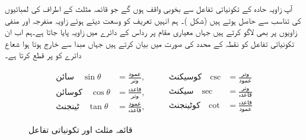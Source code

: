 آپ  زاویہ حادہ کے تکونیاتی تفاعل سے بخوبی واقف ہوں گے جو قائمہ مثلث کے اطراف کی لمبائیوں کی تناسب سے حاصل ہوتے ہیں (شکل )۔ ہم انہیں تعریف کو وسعت دیتے ہوئے  زاویہ منفرجہ اور منفی زاویوں پر بھی لاگو کرتے ہیں جہاں معیاری مقام پر رداس  کے دائرے میں زاویہ پایا جاتا ہے۔ہم اب ان تکونیاتی تفاعل کو نقطہ  کے محدد کی صورت میں بیان کرتے ہیں جہاں مبدا سے خارج ہوتا ہوا شعاع دائرے کو  پر قطع کرتا ہے۔
\begin{figure}
\centering
\begin{minipage}[b][][b]{0.3\textwidth}
\centering
{}
\end{minipage}\hfill
\begin{minipage}[b][][b]{0.66\textwidth}
\begin{gather*}
\begin{aligned}
\text{سائن}\quad \sin \theta&=\tfrac{\text{عمود}}{\text{وتر}},\\
\text{کوسائن}\quad\cos \theta&=\tfrac{\text{قاعدہ}}{\text{وتر}},\\
\text{ٹینجنٹ}\quad \tan \theta&=\tfrac{\text{عمود}}{\text{قاعدہ}},
\end{aligned}\quad\quad
\begin{aligned}
\text{کوسیکنٹ}\quad\csc&=\tfrac{\text{وتر}}{\text{عمود}}\\
\text{سیکنٹ}\quad\sec&=\tfrac{\text{وتر}}{\text{قاعدہ}}\\
\text{کوٹینجنٹ}\quad\cot&=\tfrac{\text{قاعدہ}}{\text{عمود}}
\end{aligned}
\end{gather*}
\end{minipage}%
\caption{قائمہ مثلث اور تکونیاتی تفاعل}
\label{شکل_ابتدا_قائمہ_مثلث}
\end{figure}

